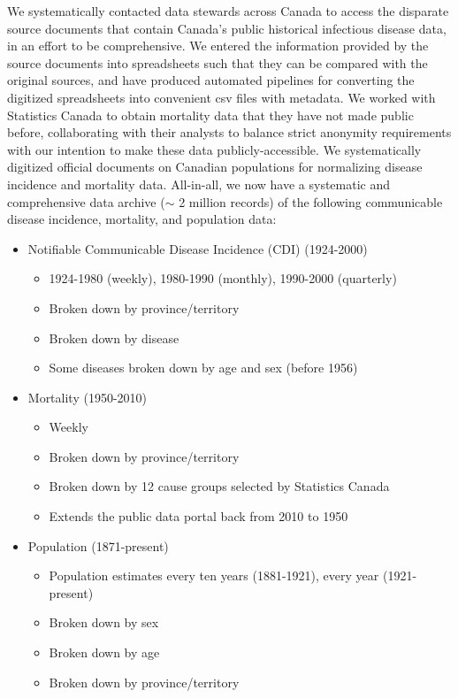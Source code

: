 We systematically contacted data stewards across Canada to access the disparate source documents that contain Canada's public historical infectious disease data, in an effort to be comprehensive. We entered the information provided by the source documents into spreadsheets such that they can be compared with the original sources, and have produced automated pipelines for converting the digitized spreadsheets into convenient csv files with metadata. We worked with Statistics Canada to obtain mortality data that they have not made public before, collaborating with their analysts to balance strict anonymity requirements with our intention to make these data publicly-accessible. We systematically digitized official documents on Canadian populations for normalizing disease incidence and mortality data. All-in-all, we now have a systematic and comprehensive data archive ($\sim$ 2 million records) of the following communicable disease incidence, mortality, and population data:
\begin{itemize}
  \item Notifiable Communicable Disease Incidence (CDI) (1924-2000)
    \begin{itemize}
      \item 1924-1980 (weekly), 1980-1990 (monthly), 1990-2000 (quarterly)
      \item Broken down by province/territory
      \item Broken down by disease
      \item Some diseases broken down by age and sex (before 1956)
    \end{itemize}
  \item Mortality (1950-2010)
    \begin{itemize}
      \item Weekly
      \item Broken down by province/territory
      \item Broken down by 12 cause groups selected by Statistics Canada
      \item Extends the public data portal back from 2010 to 1950
    \end{itemize}
  \item Population (1871-present)
    \begin{itemize}
      \item Population estimates every ten years (1881-1921), every year (1921-present)
      \item Broken down by sex
      \item Broken down by age
      \item Broken down by province/territory
    \end{itemize}
\end{itemize}

